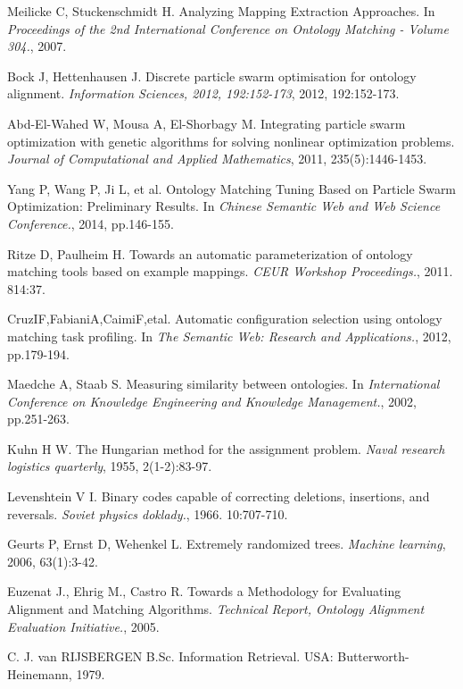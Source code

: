 \documentclass[twoside]{article}
\begin{document}
\begin{thebibliography}{99}
Meilicke C, Stuckenschmidt H. Analyzing Mapping Extraction Approaches. In {\it Proceedings of the 2nd International Conference on Ontology Matching - Volume 304.}, 2007.

Bock J, Hettenhausen J. Discrete particle swarm optimisation for ontology alignment. {\it Information Sciences, 2012, 192:152-173}, 2012, 192:152-173.

Abd-El-Wahed W, Mousa A, El-Shorbagy M. Integrating particle swarm optimization with genetic algorithms for solving nonlinear optimization problems. {\it Journal of Computational and Applied Mathematics}, 2011, 235(5):1446-1453.

Yang P, Wang P, Ji L, et al. Ontology Matching Tuning Based on Particle Swarm Optimization: Preliminary Results. In {\it Chinese Semantic Web and Web Science Conference.}, 2014, pp.146-155.

Ritze D, Paulheim H. Towards an automatic parameterization of ontology matching tools based on example mappings. {\it CEUR Workshop Proceedings.}, 2011. 814:37.

CruzIF,FabianiA,CaimiF,etal. Automatic configuration selection using ontology matching task profiling. In {\it The Semantic Web: Research and Applications.}, 2012, pp.179-194.

Maedche A, Staab S. Measuring similarity between ontologies. In {\it International Conference on Knowledge Engineering and Knowledge Management.}, 2002, pp.251-263.

Kuhn H W. The Hungarian method for the assignment problem. {\it Naval research logistics quarterly}, 1955, 2(1-2):83-97.

Levenshtein V I. Binary codes capable of correcting deletions, insertions, and reversals. {\it Soviet physics doklady.}, 1966. 10:707-710.

Geurts P, Ernst D, Wehenkel L. Extremely randomized trees. {\it Machine learning},  2006, 63(1):3-42.

Euzenat J., Ehrig M., Castro R. Towards a Methodology for Evaluating Alignment and Matching Algorithms. {\it Technical Report, Ontology Alignment Evaluation Initiative.}, 2005.

C. J. van RIJSBERGEN B.Sc. Information Retrieval. USA: Butterworth-Heinemann, 1979.

\end{thebibliography}



\label{last-page}
\label{last-page}
\end{document}
